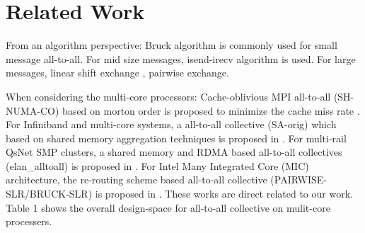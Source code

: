 \section{Related Work}

From an algorithm perspective: Bruck algorithm \cite{bruck1997efficient} is commonly used for small message all-to-all. For mid size messages, isend-irecv algorithm is used. For large messages, linear shift exchange \cite{ranka1994static}, pairwise exchange\cite{thakur2005optimization}.

When considering the multi-core processors:  
Cache-oblivious MPI all-to-all (SH-NUMA-CO) based on morton order is proposed to minimize the cache miss rate \cite{li2017cache}.
For Infiniband and multi-core systems, a all-to-all collective (SA-orig) which based on shared memory aggregation techniques is proposed in \cite{kumar2008scaling}.
For multi-rail QsNet SMP clusters, a shared memory and RDMA based all-to-all collectives (elan\_alltoall) is proposed in \cite{qian2008efficient}.
For Intel Many Integrated Core (MIC) architecture,  the re-routing scheme based all-to-all collective (PAIRWISE-SLR/BRUCK-SLR) is proposed in \cite{venkatesh2014high}. 
These works are direct related to our work. 
Table 1 shows the overall design-space for all-to-all collective on mulit-core processers.

